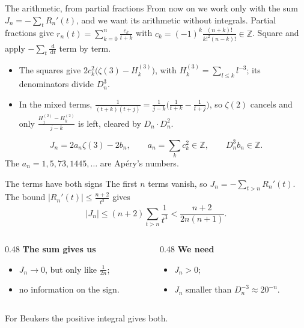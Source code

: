 \documentclass[aspectratio=169,11pt]{beamer}
\newcommand{\Z}{\mathbb{Z}}
\newcommand{\dd}{\,\mathrm{d}}
\newcommand{\Dn}{D_n}
\begin{document}
\begin{frame}{The arithmetic, from partial fractions}
  From now on we work only with the sum $J_n=-\sum_tR_n'(t)$, and we want its arithmetic without
  integrals. Partial fractions give
  $r_n(t)=\sum_{k=0}^n\frac{c_k}{t+k}$ with $c_k=(-1)^k\frac{(n+k)!}{k!^2(n-k)!}\in\Z$.
  Square and apply $-\sum_t\frac{\dd}{\dd t}$ term by term.
  \begin{itemize}
    \item The squares give $2c_k^2\bigl(\zeta(3)-H_k^{(3)}\bigr)$, with $H_k^{(3)}=\sum_{l\le k}l^{-3}$; its
      denominators divide $\Dn^3$.
    \item In the mixed terms, $\frac1{(t+k)(t+j)}=\frac1{j-k}\bigl(\frac1{t+k}-\frac1{t+j}\bigr)$, so $\zeta(2)$
      cancels and only $\frac{H_j^{(2)}-H_k^{(2)}}{j-k}$ is left, cleared by $\Dn\cdot\Dn^2$.
  \end{itemize}
  \[
    J_n=2a_n\zeta(3)-2b_n,\qquad a_n=\sum_kc_k^2\in\Z,\qquad \Dn^3b_n\in\Z .
  \]
  The $a_n=1,5,73,1445,\dots$ are Ap\'ery's numbers.
\end{frame}

\begin{frame}{The terms have both signs}
  The first $n$ terms vanish, so $J_n=-\sum_{t>n}R_n'(t)$. The bound
  $|R_n'(t)|\le\frac{n+2}{t^3}$ gives
  \[
    |J_n|\le(n+2)\sum_{t>n}\frac1{t^3}<\frac{n+2}{2n(n+1)} .
  \]
  \pause
  \begin{columns}[T]
    \begin{column}{0.48\textwidth}
      \textbf{The sum gives us}
      \begin{itemize}
        \item $J_n\to0$, but only like $\frac1{2n}$;
        \item no information on the sign.
      \end{itemize}
    \end{column}
    \begin{column}{0.48\textwidth}
      \textbf{We need}
      \begin{itemize}
        \item $J_n>0$;
        \item $J_n$ smaller than $\Dn^{-3}\approx20^{-n}$.
      \end{itemize}
    \end{column}
  \end{columns}
  \pause
  \medskip

  For Beukers the positive integral gives both.
\end{frame}
\end{document}

